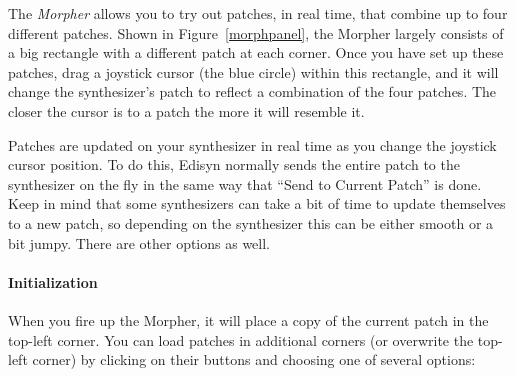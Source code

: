 \documentclass{article}
\begin{document}
The {\it Morpher} allows you to try out patches, in real time, that combine up to four different patches. Shown in Figure~\ref{morphpanel}, the Morpher largely consists of a big rectangle with a different patch at each corner.  Once you have set up these patches, drag a joystick cursor (the blue circle) within this rectangle, and it will change the synthesizer's patch to reflect a combination of the four patches.  The closer the cursor is to a patch the more it will resemble it.

Patches are updated on your synthesizer in real time as you change the joystick cursor position.  To do this, Edisyn normally sends the entire patch to the synthesizer on the fly in the same way that ``Send to Current Patch'' is done.  Keep in mind that some synthesizers can take a bit of time to update themselves to a new patch, so depending on the synthesizer this can be either smooth or a bit jumpy.  There are other options as well.

\paragraph{Initialization} When you fire up the Morpher, it will place a copy of the current patch in the top-left corner.  You can load patches in additional corners (or overwrite the top-left corner) by clicking on their buttons and choosing one of several options:
\end{document}
